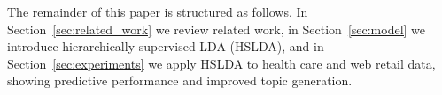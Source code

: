The remainder of this paper is structured as follows.  In Section~\ref{sec:related_work} we review related work, in Section~\ref{sec:model} we introduce hierarchically supervised LDA (HSLDA), and in Section~\ref{sec:experiments} we apply HSLDA to health care and web retail data, showing predictive performance and improved topic generation.




%



